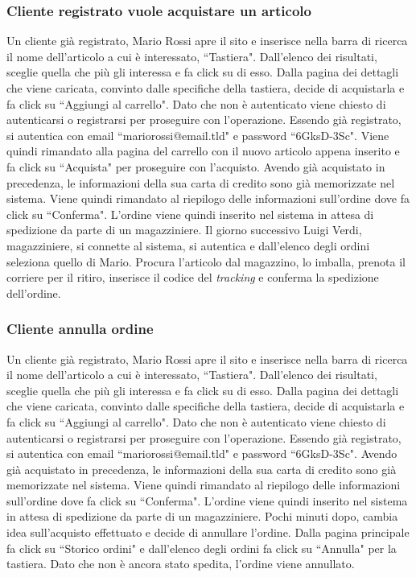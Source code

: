 \documentclass[12pt,a4paper]{article}
\begin{document}
\subsubsection{Cliente registrato vuole acquistare un articolo}
Un cliente già registrato, Mario Rossi apre il sito e inserisce nella barra di ricerca il nome dell'articolo a cui è interessato, ``Tastiera".
Dall'elenco dei risultati, sceglie quella che più gli interessa e fa click su di esso.
Dalla pagina dei dettagli che viene caricata, convinto dalle specifiche della tastiera, decide di acquistarla e fa click su ``Aggiungi al carrello".
Dato che non è autenticato viene chiesto di autenticarsi o registrarsi per proseguire con l'operazione.
Essendo già registrato, si autentica con email ``mariorossi@email.tld" e password ``6GksD-3Sc".
Viene quindi rimandato alla pagina del carrello con il nuovo articolo appena inserito e fa click su ``Acquista" per proseguire con l'acquisto.
Avendo già acquistato in precedenza, le informazioni della sua carta di credito sono già memorizzate nel sistema.
Viene quindi rimandato al riepilogo delle informazioni sull'ordine dove fa click su ``Conferma".
L'ordine viene quindi inserito nel sistema in attesa di spedizione da parte di un magazziniere.
Il giorno successivo Luigi Verdi, magazziniere, si connette al sistema, si autentica e dall'elenco degli ordini seleziona quello di Mario. Procura l'articolo dal magazzino, lo imballa, prenota il corriere per il ritiro, inserisce il codice del \emph{tracking} e conferma la spedizione dell'ordine.

\subsubsection{Cliente annulla ordine}
Un cliente già registrato, Mario Rossi apre il sito e inserisce nella barra di ricerca il nome dell'articolo a cui è interessato, ``Tastiera".
Dall'elenco dei risultati, sceglie quella che più gli interessa e fa click su di esso.
Dalla pagina dei dettagli che viene caricata, convinto dalle specifiche della tastiera, decide di acquistarla e fa click su ``Aggiungi al carrello".
Dato che non è autenticato viene chiesto di autenticarsi o registrarsi per proseguire con l'operazione.
Essendo già registrato, si autentica con email ``mariorossi@email.tld" e password ``6GksD-3Sc".
Avendo già acquistato in precedenza, le informazioni della sua carta di credito sono già memorizzate nel sistema.
Viene quindi rimandato al riepilogo delle informazioni sull'ordine dove fa click su ``Conferma".
L'ordine viene quindi inserito nel sistema in attesa di spedizione da parte di un magazziniere.
Pochi minuti dopo, cambia idea sull'acquisto effettuato e decide di annullare l'ordine.
Dalla pagina principale fa click su ``Storico ordini" e dall'elenco degli ordini fa click su ``Annulla" per la tastiera.
Dato che non è ancora stato spedita, l'ordine viene annullato.
\end{document}

